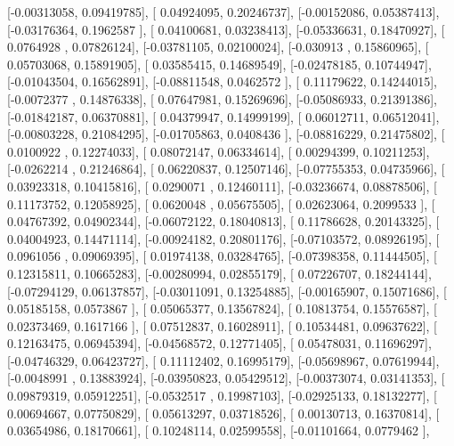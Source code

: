 \documentclass{article}
\begin{document}
       [-0.00313058,  0.09419785],
       [ 0.04924095,  0.20246737],
       [-0.00152086,  0.05387413],
       [-0.03176364,  0.1962587 ],
       [ 0.04100681,  0.03238413],
       [-0.05336631,  0.18470927],
       [ 0.0764928 ,  0.07826124],
       [-0.03781105,  0.02100024],
       [-0.030913  ,  0.15860965],
       [ 0.05703068,  0.15891905],
       [ 0.03585415,  0.14689549],
       [-0.02478185,  0.10744947],
       [-0.01043504,  0.16562891],
       [-0.08811548,  0.0462572 ],
       [ 0.11179622,  0.14244015],
       [-0.0072377 ,  0.14876338],
       [ 0.07647981,  0.15269696],
       [-0.05086933,  0.21391386],
       [-0.01842187,  0.06370881],
       [ 0.04379947,  0.14999199],
       [ 0.06012711,  0.06512041],
       [-0.00803228,  0.21084295],
       [-0.01705863,  0.0408436 ],
       [-0.08816229,  0.21475802],
       [ 0.0100922 ,  0.12274033],
       [ 0.08072147,  0.06334614],
       [ 0.00294399,  0.10211253],
       [-0.0262214 ,  0.21246864],
       [ 0.06220837,  0.12507146],
       [-0.07755353,  0.04735966],
       [ 0.03923318,  0.10415816],
       [ 0.0290071 ,  0.12460111],
       [-0.03236674,  0.08878506],
       [ 0.11173752,  0.12058925],
       [ 0.0620048 ,  0.05675505],
       [ 0.02623064,  0.2099533 ],
       [ 0.04767392,  0.04902344],
       [-0.06072122,  0.18040813],
       [ 0.11786628,  0.20143325],
       [ 0.04004923,  0.14471114],
       [-0.00924182,  0.20801176],
       [-0.07103572,  0.08926195],
       [ 0.0961056 ,  0.09069395],
       [ 0.01974138,  0.03284765],
       [-0.07398358,  0.11444505],
       [ 0.12315811,  0.10665283],
       [-0.00280994,  0.02855179],
       [ 0.07226707,  0.18244144],
       [-0.07294129,  0.06137857],
       [-0.03011091,  0.13254885],
       [-0.00165907,  0.15071686],
       [ 0.05185158,  0.0573867 ],
       [ 0.05065377,  0.13567824],
       [ 0.10813754,  0.15576587],
       [ 0.02373469,  0.1617166 ],
       [ 0.07512837,  0.16028911],
       [ 0.10534481,  0.09637622],
       [ 0.12163475,  0.06945394],
       [-0.04568572,  0.12771405],
       [ 0.05478031,  0.11696297],
       [-0.04746329,  0.06423727],
       [ 0.11112402,  0.16995179],
       [-0.05698967,  0.07619944],
       [-0.0048991 ,  0.13883924],
       [-0.03950823,  0.05429512],
       [-0.00373074,  0.03141353],
       [ 0.09879319,  0.05912251],
       [-0.0532517 ,  0.19987103],
       [-0.02925133,  0.18132277],
       [ 0.00694667,  0.07750829],
       [ 0.05613297,  0.03718526],
       [ 0.00130713,  0.16370814],
       [ 0.03654986,  0.18170661],
       [ 0.10248114,  0.02599558],
       [-0.01101664,  0.0779462 ],
\end{document}
